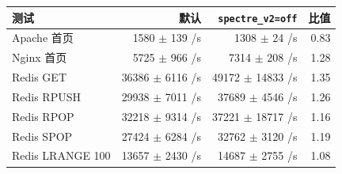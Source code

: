 \begin{tabular}{@{}lrrr@{}}
\toprule
测试 & 默认 & \texttt{spectre\_v2=off} & 比值 \\
\midrule
Apache 首页 & 1580 $\pm$ 139 /s & 1308 $\pm$ 24 /s & 0.83 \\
Nginx 首页 & 5725 $\pm$ 966 /s & 7314 $\pm$ 208 /s & 1.28 \\
Redis GET & 36386 $\pm$ 6116 /s & 49172 $\pm$ 14833 /s & 1.35 \\
Redis RPUSH & 29938 $\pm$ 7011 /s & 37689 $\pm$ 4546 /s & 1.26 \\
Redis RPOP & 32218 $\pm$ 9314 /s & 37221 $\pm$ 18717 /s & 1.16 \\
Redis SPOP & 27424 $\pm$ 6284 /s & 32762 $\pm$ 3120 /s & 1.19 \\
Redis LRANGE 100 & 13657 $\pm$ 2430 /s & 14687 $\pm$ 2755 /s & 1.08 \\
\bottomrule
\end{tabular}
